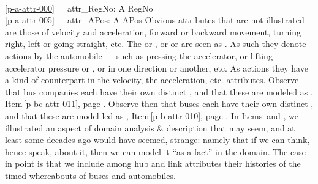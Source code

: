 {\ \ \\
\ref{p-a-attr-000}\ \ \ attr\_RegNo: A {\RIGHTARROW} RegNo \\
\ref{p-a-attr-005}\ \ \ attr\_APos: A {\RIGHTARROW} APos 
\ep
\mnewfoil
\noindent
\begynd
\pind Obvious attributes that are not illustrated are those of
\begynd
\pind velocity and acceleration, 
\pind forward or backward movement, 
\pind turning right, left or going straight, 
\pind etc.
\afslut
\afslut
\mnewfoil
\noindent
\begynd
\pind The  or , or  or
       are seen as . 
\begynd
\pind As such they denote actions by the automobile ---
\pind such as \textsf{pressing the accelerator}, or \textsf{lifting
      accelerator pressure} or 
      , or  in one direction or
      another, etc.
\pind As actions they have a kind of counterpart in the
      \textsf{vel}ocity, the \textsf{acc}eleration, etc. attributes.
\afslut
\afslut
\pos{\emcii}{}
\mnewfoil
\begynd
\pind Observe that bus companies each have their own distinct
      , and that these are modeled as
      , Item\,\vref{p-bc-attr-011}, page
      \pageref{p-bc-attr-011}.  
\pind Observe then that buses each have their own distinct , and that these are model-led as ,
      Item\,\vref{p-b-attr-010}, page \pageref{p-b-attr-010}.
\mnewfoil
\pind In Items\, and , 
      we illustrated an aspect of domain 
      analysis \& description that may seem, and at least some decades
      ago would have seemed, strange: namely that if we can think,
      hence speak, about it, then we can model it ``as a fact'' in the
      domain. The case in point is that we include among hub and link
      attributes their histories of the timed whereabouts of buses and
      automobiles.\footnotemark
\afslut
} 
\pos{\psno}{\mnewfoil}

